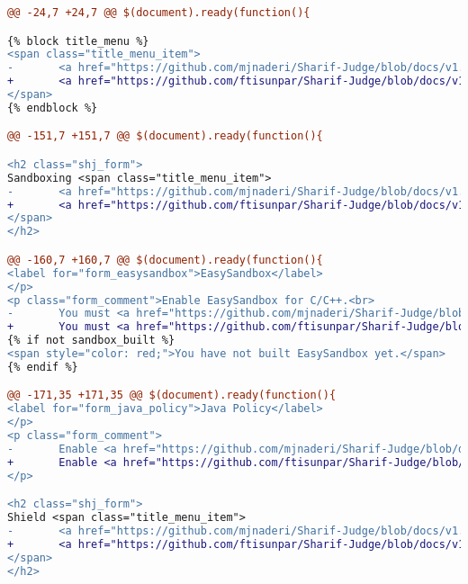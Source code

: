\begin{lstlisting}[language=diff, caption=Perubahan kode program pada halaman \textit{settings.twig}, label=lstt:4, basicstyle=\ttfamily, frame=single,
columns=fullflexible, keepspaces=true, breaklines=true]
@@ -24,7 +24,7 @@ $(document).ready(function(){

{% block title_menu %}
<span class="title_menu_item">
-       <a href="https://github.com/mjnaderi/Sharif-Judge/blob/docs/v1.4/settings.md" target="_blank"><i class="fa fa-question-circle color6"></i> Help</a>
+       <a href="https://github.com/ftisunpar/Sharif-Judge/blob/docs/v1.4/settings.md" target="_blank"><i class="fa fa-question-circle color6"></i> Help</a>
</span>
{% endblock %}

@@ -151,7 +151,7 @@ $(document).ready(function(){

<h2 class="shj_form">
Sandboxing <span class="title_menu_item">
-       <a href="https://github.com/mjnaderi/Sharif-Judge/blob/docs/v1.4/sandboxing.md" target="_blank"><i class="fa fa-question-circle color11"></i> Help</a>
+       <a href="https://github.com/ftisunpar/Sharif-Judge/blob/docs/v1.4/sandboxing.md" target="_blank"><i class="fa fa-question-circle color11"></i> Help</a>
</span>
</h2>

@@ -160,7 +160,7 @@ $(document).ready(function(){
<label for="form_easysandbox">EasySandbox</label>
</p>
<p class="form_comment">Enable EasySandbox for C/C++.<br>
-       You must <a href="https://github.com/mjnaderi/Sharif-Judge/blob/docs/v1.4/sandboxing.md#build-easysandbox" target="_blank">build EasySandbox</a> before enabling it.<br>
+       You must <a href="https://github.com/ftisunpar/Sharif-Judge/blob/docs/v1.4/sandboxing.md#build-easysandbox" target="_blank">build EasySandbox</a> before enabling it.<br>
{% if not sandbox_built %}
<span style="color: red;">You have not built EasySandbox yet.</span>
{% endif %}

@@ -171,35 +171,35 @@ $(document).ready(function(){
<label for="form_java_policy">Java Policy</label>
</p>
<p class="form_comment">
-       Enable <a href="https://github.com/mjnaderi/Sharif-Judge/blob/docs/v1.4/sandboxing.md#java-sandboxing" target="_blank">Java Sandboxing</a>
+       Enable <a href="https://github.com/ftisunpar/Sharif-Judge/blob/docs/v1.4/sandboxing.md#java-sandboxing" target="_blank">Java Sandboxing</a>
</p>

<h2 class="shj_form">
Shield <span class="title_menu_item">
-       <a href="https://github.com/mjnaderi/Sharif-Judge/blob/docs/v1.4/shield.md" target="_blank"><i class="fa fa-question-circle color11"></i> Help</a>
+       <a href="https://github.com/ftisunpar/Sharif-Judge/blob/docs/v1.4/shield.md" target="_blank"><i class="fa fa-question-circle color11"></i> Help</a>
</span>
</h2>


\end{lstlisting}
